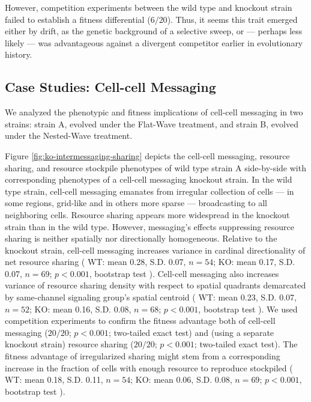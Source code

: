 However, competition experiments between the wild type and knockout strain failed to establish a fitness differential ($6/20$).
Thus, it seems this trait emerged either by drift, as the genetic background of a selective sweep, or --- perhaps less likely --- was advantageous against a divergent competitor earlier in evolutionary history.

\subsection{Case Studies: Cell-cell Messaging} \label{sec:cell-cell-messaging}



We analyzed the phenotypic and fitness implications of cell-cell messaging in two strains: strain A, evolved under the Flat-Wave treatment, and strain B, evolved under the Nested-Wave treatment.

Figure \ref{fig:ko-intermessaging-sharing} depicts the cell-cell messaging, resource sharing, and resource stockpile phenotypes of wild type strain A side-by-side with corresponding phenotypes of a cell-cell messaging knockout strain.
In the wild type strain, cell-cell messaging emanates from irregular collection of cells --- in some regions, grid-like and in others more sparse --- broadcasting to all neighboring cells.
Resource sharing appears more widespread in the knockout strain than in the wild type.
However, messaging's effects suppressing resource sharing is neither spatially nor directionally homogeneous.
Relative to the knockout strain, cell-cell messaging increases variance in cardinal directionality of net resource sharing
(%
WT: mean 0.28, S.D. 0.07, $n=54$; %
KO: mean 0.17, S.D. 0.07, $n=69$; %
$p < 0.001$, bootstrap test%
).
Cell-cell messaging also increases variance of resource sharing density with respect to spatial quadrants demarcated by same-channel signaling group's spatial centroid
(%
WT: mean 0.23, S.D. 0.07, $n=52$; %
KO: mean 0.16, S.D. 0.08, $n=68$; %
$p < 0.001$, bootstrap test%
).
We used competition experiments to confirm the fitness advantage both of cell-cell messaging ($20/20$; $p < 0.001$; two-tailed exact test) and (using a separate knockout strain) resource sharing ($20/20$; $p < 0.001$; two-tailed exact test).
The fitness advantage of irregularized sharing might stem from a corresponding increase in the fraction of cells with enough resource to reproduce stockpiled
(%
WT: mean 0.18, S.D. 0.11, $n=54$; %
KO: mean 0.06, S.D. 0.08, $n=69$; %
$p < 0.001$, bootstrap test%
).


